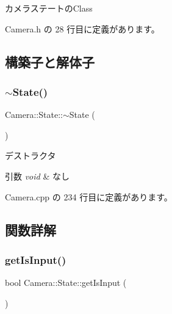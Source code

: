 カメラステートの\+Class 

 Camera.\+h の 28 行目に定義があります。



\subsection{構築子と解体子}
\mbox{\label{class_camera_1_1_state_a7d179b912e68fa3dc659ae4d5422ca97}} 
\subsubsection{\texorpdfstring{$\sim$\+State()}{~State()}}
{\footnotesize\ttfamily Camera\+::\+State\+::$\sim$\+State (\begin{DoxyParamCaption}{ }\end{DoxyParamCaption})\hspace{0.3cm}{\ttfamily [pure virtual]}}



デストラクタ 


\begin{DoxyParams}{引数}
{\em void} & なし \\
\hline
\end{DoxyParams}


 Camera.\+cpp の 234 行目に定義があります。



\subsection{関数詳解}
\mbox{\label{class_camera_1_1_state_a23d6de73794a7a47a640ccb4d3e1b4ca}} 
\subsubsection{\texorpdfstring{get\+Is\+Input()}{getIsInput()}}
{\footnotesize\ttfamily bool Camera\+::\+State\+::get\+Is\+Input (\begin{DoxyParamCaption}{ }\end{DoxyParamCaption})}



